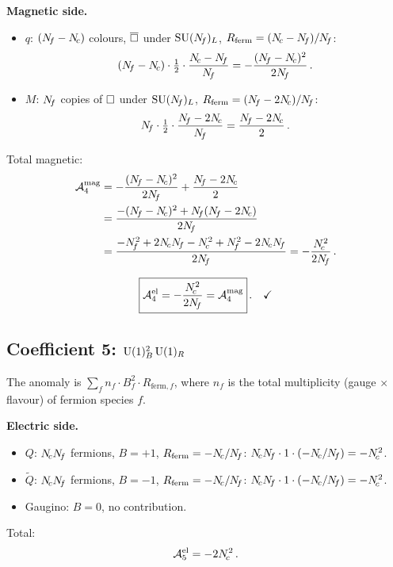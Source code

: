 \documentclass[11pt,a4paper]{article}
\begin{document}
\textbf{Magnetic side.}
\begin{itemize}
  \item $q$: $(N_{\!f} - N_{\!c})$ colours, $\overline{\square}$ under $\mathrm{SU}(N_{\!f})_L$,
    $R_{\text{ferm}} = (N_{\!c} - N_{\!f})/N_{\!f}$:
    \[
      (\Nf - \Nc) \cdot \tfrac{1}{2} \cdot \frac{\Nc - \Nf}{\Nf}
      = -\frac{(\Nf - \Nc)^2}{2\Nf}\,.
    \]
  \item $M$: $N_{\!f}$ copies of $\square$ under $\mathrm{SU}(N_{\!f})_L$,
    $R_{\text{ferm}} = (N_{\!f} - 2N_{\!c})/N_{\!f}$:
    \[
      N_{\!f} \cdot \tfrac{1}{2} \cdot \frac{N_{\!f} - 2N_{\!c}}{N_{\!f}}
      = \frac{N_{\!f} - 2N_{\!c}}{2}\,.
    \]
\end{itemize}
Total magnetic:
\begin{align*}
  \mathcal{A}^{\text{mag}}_4
  &= -\frac{(\Nf - \Nc)^2}{2\Nf} + \frac{\Nf - 2\Nc}{2} \\
  &= \frac{-(\Nf - \Nc)^2 + \Nf(\Nf - 2\Nc)}{2\Nf} \\
  &= \frac{-\Nf^2 + 2\Nc\Nf - \Nc^2 + \Nf^2 - 2\Nc\Nf}{2\Nf}
  = -\frac{\Nc^2}{2\Nf}\,.
\end{align*}

\begin{equation}\label{eq:anom4}
  \boxed{\mathcal{A}^{\text{el}}_4 = -\frac{N_{\!c}^2}{2N_{\!f}}
    = \mathcal{A}^{\text{mag}}_4}\,.
  \quad\checkmark
\end{equation}

\subsection{Coefficient 5: $\mathrm{U}(1)_B^2\,\mathrm{U}(1)_R$}
\label{ssec:anom5}

The anomaly is $\sum_f n_f \cdot B_f^2 \cdot R_{\text{ferm},f}$, where $n_f$
is the total multiplicity (gauge $\times$ flavour) of fermion species $f$.

\textbf{Electric side.}
\begin{itemize}
  \item $Q$: $N_{\!c} N_{\!f}$ fermions, $B = +1$, $R_{\text{ferm}} = -N_{\!c}/N_{\!f}$:
    \;$N_{\!c} N_{\!f} \cdot 1 \cdot (-N_{\!c}/N_{\!f}) = -N_{\!c}^2$.
  \item $\widetilde{Q}$: $N_{\!c} N_{\!f}$ fermions, $B = -1$,
    $R_{\text{ferm}} = -N_{\!c}/N_{\!f}$:
    \;$N_{\!c} N_{\!f} \cdot 1 \cdot (-N_{\!c}/N_{\!f}) = -N_{\!c}^2$.
  \item Gaugino: $B = 0$, no contribution.
\end{itemize}
Total:
\[
  \mathcal{A}^{\text{el}}_5 = -2N_{\!c}^2\,.
\]
\end{document}
